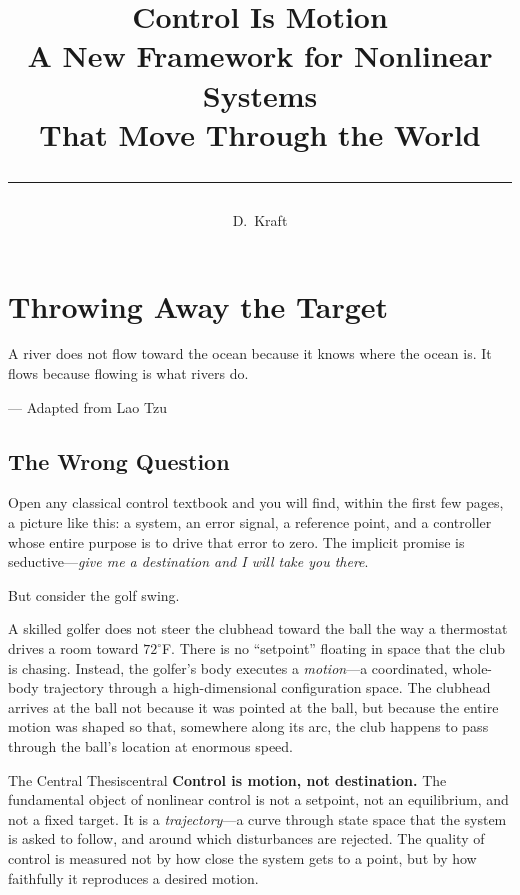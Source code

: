 \documentclass[12pt, openany]{book}
\title{%
  {\Huge\bfseries\color{chapblue} Control Is Motion}\\[0.4cm]
  {\Large A New Framework for Nonlinear Systems\\
  That Move Through the World}\\[0.6cm]
  {\color{chapblue}\rule{\textwidth}{2pt}}
}
\author{{\Large D.\ Kraft}}
\date{}
\theoremstyle{plain}
\begin{document}
\maketitle
\thispagestyle{empty}
\cleardoublepage

\tableofcontents
\cleardoublepage

\chapter{Throwing Away the Target}

\epigraph{%
  A river does not flow toward the ocean because it knows where the ocean is.
  It flows because flowing is what rivers do.
}{--- \textup{Adapted from Lao Tzu}}

\vspace{0.5cm}

\section{The Wrong Question}

Open any classical control textbook and you will find, within the first few pages, a
picture like this: a system, an error signal, a reference point, and a controller
whose entire purpose is to drive that error to zero. The implicit promise is
seductive---\emph{give me a destination and I will take you there}.

But consider the golf swing.

A skilled golfer does not steer the clubhead toward the ball the way a thermostat
drives a room toward $72^\circ$F. There is no ``setpoint'' floating in space that
the club is chasing. Instead, the golfer's body executes a \emph{motion}---a
coordinated, whole-body trajectory through a high-dimensional configuration space.
The clubhead arrives at the ball not because it was pointed at the ball, but because
the entire motion was shaped so that, somewhere along its arc, the club happens to
pass through the ball's location at enormous speed.

\begin{keyidea}{The Central Thesis}{central}
  \textbf{Control is motion, not destination.}
  The fundamental object of nonlinear control is not a setpoint, not an equilibrium,
  and not a fixed target. It is a \emph{trajectory}---a curve through state space
  that the system is asked to follow, and around which disturbances are rejected.
  The quality of control is measured not by how close the system gets to a point,
  but by how faithfully it reproduces a desired motion.
\end{keyidea}
\end{document}
